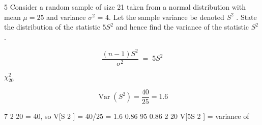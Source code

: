 \documentclass[a4paper,12pt]{article}
\begin{document}
\large 

5
\noident Consider a random sample of size 21 taken from a normal distribution with mean
$\mu = 25$ and variance $\sigma^2$ = 4. Let the sample variance be denoted $S^2$ .
State the distribution of the statistic $5S^2$ and hence find the variance of the statistic $S^2$ .




\[ \frac{(n-1) S^2}{\sigma^2} \;=\; 5S^2 \]

$ \chi^{2}_{20} $

\[ \operatorname{Var}(S^2) = \frac{40}{25} = 1.6\]





7
2
20 =
40, so V[S 2 ] = 40/25 = 1.6
0.86
95%
0.86
2
20
V[5S 2 ] = variance of
\end{document}
